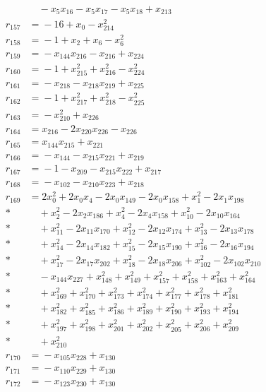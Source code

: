 \documentclass[11pt]{article}
\theoremstyle{remark}\newtheorem{remark}[theorem]{Remark}
\begin{document}
\begin{align*}
&\quad{}-x_{5}x_{16}-x_{5}x_{17}-x_{5}x_{18}+x_{213}\\[2pt]
r_{157}&={}-16+x_{0}-x_{214}^{2}\\[2pt]
r_{158}&={}-1+x_{2}+x_{6}-x_{6}^{2}\\[2pt]
r_{159}&={}-x_{144}x_{216}-x_{216}+x_{224}\\[2pt]
r_{160}&={}-1+x_{215}^{2}+x_{216}^{2}-x_{224}^{2}\\[2pt]
r_{161}&={}-x_{218}-x_{218}x_{219}+x_{225}\\[2pt]
r_{162}&={}-1+x_{217}^{2}+x_{218}^{2}-x_{225}^{2}\\[2pt]
r_{163}&={}-x_{210}^{2}+x_{226}\\[2pt]
r_{164}&={}x_{216}-2x_{220}x_{226}-x_{226}\\[2pt]
r_{165}&={}x_{144}x_{215}+x_{221}\\[2pt]
r_{166}&={}-x_{144}-x_{215}x_{221}+x_{219}\\[2pt]
r_{167}&={}-1-x_{209}-x_{215}x_{222}+x_{217}\\[2pt]
r_{168}&={}-x_{102}-x_{210}x_{223}+x_{218}\\[2pt]
r_{169}&={}2x_{0}^{2}+2x_{0}x_{4}-2x_{0}x_{149}-2x_{0}x_{158}+x_{1}^{2}-2x_{1}x_{198}\\*
&\quad{}+x_{2}^{2}-2x_{2}x_{186}+x_{4}^{2}-2x_{4}x_{158}+x_{10}^{2}-2x_{10}x_{164}\\*
&\quad{}+x_{11}^{2}-2x_{11}x_{170}+x_{12}^{2}-2x_{12}x_{174}+x_{13}^{2}-2x_{13}x_{178}\\*
&\quad{}+x_{14}^{2}-2x_{14}x_{182}+x_{15}^{2}-2x_{15}x_{190}+x_{16}^{2}-2x_{16}x_{194}\\*
&\quad{}+x_{17}^{2}-2x_{17}x_{202}+x_{18}^{2}-2x_{18}x_{206}+x_{102}^{2}-2x_{102}x_{210}\\*
&\quad{}-x_{144}x_{227}+x_{148}^{2}+x_{149}^{2}+x_{157}^{2}+x_{158}^{2}+x_{163}^{2}+x_{164}^{2}\\*
&\quad{}+x_{169}^{2}+x_{170}^{2}+x_{173}^{2}+x_{174}^{2}+x_{177}^{2}+x_{178}^{2}+x_{181}^{2}\\*
&\quad{}+x_{182}^{2}+x_{185}^{2}+x_{186}^{2}+x_{189}^{2}+x_{190}^{2}+x_{193}^{2}+x_{194}^{2}\\*
&\quad{}+x_{197}^{2}+x_{198}^{2}+x_{201}^{2}+x_{202}^{2}+x_{205}^{2}+x_{206}^{2}+x_{209}^{2}\\*
&\quad{}+x_{210}^{2}\\[2pt]
r_{170}&={}-x_{105}x_{228}+x_{130}\\[2pt]
r_{171}&={}-x_{110}x_{229}+x_{130}\\[2pt]
r_{172}&={}-x_{123}x_{230}+x_{130}\\[2pt]

\end{align*}
\end{document}
